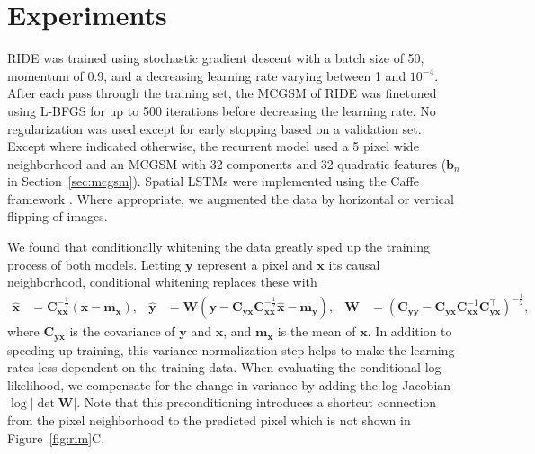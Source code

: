 \documentclass{article}
\begin{document}
	\section{Experiments}
		\label{sec:experiments}
		RIDE was trained using stochastic gradient descent with a batch size of 50, momentum of 0.9, and a decreasing learning rate varying
		between 1 and $10^{-4}$.
		After each pass through the training set, the MCGSM of RIDE was finetuned using L-BFGS for
		up to 500 iterations before decreasing the learning rate. No regularization was used except for early stopping based on
		a validation set. Except where indicated otherwise, the recurrent model used a
		5 pixel wide neighborhood and an MCGSM with 32 components and 32
		quadratic features ($\mathbf{b}_n$ in Section~\ref{sec:mcgsm}). Spatial LSTMs were implemented using
		the Caffe framework \cite{jia:2014}. Where appropriate, we augmented the data by horizontal
		or vertical flipping of images.

		We found that conditionally whitening the data greatly sped up the training process of both
		models. Letting $\mathbf{y}$ represent a pixel and
		$\mathbf{x}$ its causal neighborhood, conditional whitening replaces these with
\begin{align}
			\mathbf{\hat x} &= \textstyle\mathbf{C}_\mathbf{xx}^{-\frac{1}{2}} \left( \mathbf{x} - \mathbf{m}_\mathbf{x} \right), &
			\mathbf{\hat y} &= \textstyle \mathbf{W} (\mathbf{y} - \mathbf{C}_{\mathbf{yx}} \mathbf{C}_\mathbf{xx}^{-\frac{1}{2}} \mathbf{\hat x} - \mathbf{m}_\mathbf{y}), &
			\mathbf{W} &= (\mathbf{C}_\mathbf{yy} - \mathbf{C}_{\mathbf{yx}} \mathbf{C}_\mathbf{xx}^{-1} \mathbf{C}_{\mathbf{yx}}^\top)^{-\frac{1}{2}},
		\end{align}
		where
		$\mathbf{C}_{\mathbf{yx}}$ is the covariance of $\mathbf{y}$ and $\mathbf{x}$, and
		$\mathbf{m}_\mathbf{x}$ is the mean of $\mathbf{x}$.
		In addition to speeding up training, this variance normalization step helps to make the learning
		rates less dependent on the training data. When evaluating the conditional log-likelihood,
		we compensate for the change in variance by adding the log-Jacobian $\log |\det \mathbf{W}|$. Note that this preconditioning introduces a
		shortcut connection from the pixel neighborhood to the predicted pixel which is not shown in Figure~\ref{fig:rim}C.
\end{document}
